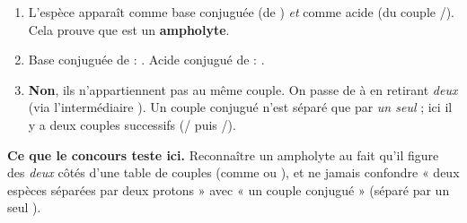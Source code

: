 \documentclass[11pt,a4paper]{article}
\begin{document}
\begin{corrbox}
\begin{enumerate}[label=\alph*),leftmargin=1.6em,itemsep=3pt]
  \item L'espèce \textbf{} apparaît comme base conjuguée (de ) \emph{et} comme acide (du
        couple /). Cela prouve que  est un \textbf{ampholyte}.
  \item Base conjuguée de  : . \quad Acide conjugué de  : .
  \item \textbf{Non}, ils n'appartiennent pas au même couple. On passe de  à  en
        retirant \emph{deux}  (via l'intermédiaire ). Un couple conjugué n'est séparé que par
        \emph{un seul}  ; ici il y a deux couples successifs (/ puis
        /).
\end{enumerate}
\end{corrbox}

\begin{astuce}
\textbf{Ce que le concours teste ici.} Reconnaître un ampholyte au fait qu'il figure des \emph{deux} côtés
d'une table de couples (comme  ou ), et ne jamais confondre « deux espèces séparées par
deux protons » avec « un couple conjugué » (séparé par un seul ).
\end{astuce}
\end{document}
